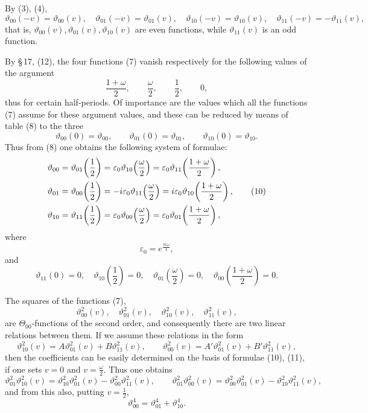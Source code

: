 \documentclass[11pt]{article}
\providecommand{\eps}{\varepsilon}
\begin{document}
By (3), (4),
\begin{equation}
\vartheta_{00}(-v)=\vartheta_{00}(v),\quad
\vartheta_{01}(-v)=\vartheta_{01}(v),\quad
\vartheta_{10}(-v)=\vartheta_{10}(v),\quad
\vartheta_{11}(-v)=-\vartheta_{11}(v),
\tag{9}
\end{equation}
that is, $\vartheta_{00}(v),\vartheta_{01}(v),\vartheta_{10}(v)$ are even functions, while $\vartheta_{11}(v)$ is an odd function.

By \S\,17, (12), the four functions (7) vanish respectively for the following values of the argument
\[
\frac{1+\omega}{2},\qquad \frac{\omega}{2},\qquad \frac12,\qquad 0,
\]
thus for certain half-periods. Of importance are the values which all the functions (7) assume for these argument values, and these can be reduced by means of table (8) to the three
\[
\vartheta_{00}(0)=\vartheta_{00},\qquad
\vartheta_{01}(0)=\vartheta_{01},\qquad
\vartheta_{10}(0)=\vartheta_{10}.
\]
Thus from (8) one obtains the following system of formulae:
\begin{align}
\vartheta_{00}&=\vartheta_{01}\!\left(\frac12\right)=\eps_0\vartheta_{10}\!\left(\frac{\omega}{2}\right)=\eps_0\vartheta_{11}\!\left(\frac{1+\omega}{2}\right),\notag\\
\vartheta_{01}&=\vartheta_{00}\!\left(\frac12\right)=-i\eps_0\vartheta_{11}\!\left(\frac{\omega}{2}\right)=i\eps_0\vartheta_{10}\!\left(\frac{1+\omega}{2}\right),\tag{10}\\
\vartheta_{10}&=\vartheta_{11}\!\left(\frac12\right)=\eps_0\vartheta_{00}\!\left(\frac{\omega}{2}\right)=\eps_0\vartheta_{01}\!\left(\frac{1+\omega}{2}\right),
\notag
\end{align}
where
\[
\eps_0=e^{\frac{\pi i\omega}{4}},
\]
and
\begin{equation}
\vartheta_{11}(0)=0,\quad
\vartheta_{10}\!\left(\frac12\right)=0,\quad
\vartheta_{01}\!\left(\frac{\omega}{2}\right)=0,\quad
\vartheta_{00}\!\left(\frac{1+\omega}{2}\right)=0.
\tag{11}
\end{equation}

The squares of the functions (7),
\begin{equation}
\vartheta_{00}^2(v),\quad \vartheta_{01}^2(v),\quad
\vartheta_{10}^2(v),\quad \vartheta_{11}^2(v),
\tag{12}
\end{equation}
are $\Theta_{00}$-functions of the second order, and consequently there are two linear relations between them. If we assume these relations in the form
\[
\vartheta_{10}^2(v)=A\vartheta_{01}^2(v)+B\vartheta_{11}^2(v),\qquad
\vartheta_{00}^2(v)=A'\vartheta_{01}^2(v)+B'\vartheta_{11}^2(v),
\]
then the coefficients can be easily determined on the basis of formulae (10), (11), if one sets $v=0$ and $v=\frac{\omega}{2}$. Thus one obtains
\begin{equation}
\vartheta_{01}^2\vartheta_{10}^2(v)=\vartheta_{10}^2\vartheta_{01}^2(v)-\vartheta_{00}^2\vartheta_{11}^2(v),\qquad
\vartheta_{01}^2\vartheta_{00}^2(v)=\vartheta_{00}^2\vartheta_{01}^2(v)-\vartheta_{10}^2\vartheta_{11}^2(v),
\tag{13}
\end{equation}
and from this also, putting $v=\frac12$,
\begin{equation}
\vartheta_{00}^4=\vartheta_{01}^4+\vartheta_{10}^4.
\tag{14}
\end{equation}
\end{document}
